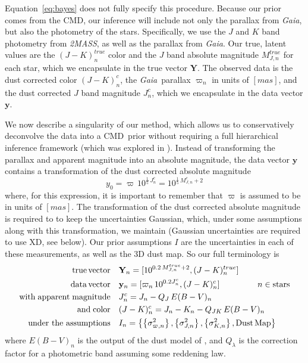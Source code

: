 \documentclass[modern]{aastex61}
\newcommand{\acronym}[1]{{\small{#1}}}
\newcommand{\project}[1]{\textsl{#1}}
\newcommand{\tmass}{\project{\acronym{2MASS}}}
\newcommand{\gaia}{\project{Gaia}}
\newcommand{\xd}{\acronym{XD}}
\newcommand{\cmd}{\acronym{CMD}}
\begin{document}
Equation~\ref{eq:bayes} does not fully specify this procedure.
Because our prior comes from the \cmd, our inference will include not only the parallax from \gaia, but also the photometry of the stars. Specifically, we use the $J$ and $K$ band photometry from \tmass, as well as the parallax from \gaia. Our true, latent values are the $(J-K)^{true}_n$ color and the $J$ band absolute magnitude $M^{true}_{J,n}$ for each star, which we encapsulate in the true vector $\mathbf{Y}$. The observed data is the dust corrected color $(J-K)^c_n$, the \gaia\ parallax $\varpi_n$ in units of $[mas]$, and the dust corrected $J$ band magnitude $J^c_n$, which we encapsulate in the data vector $\mathbf{y}$.

We now describe a singularity of our method, which allows us to conservatively deconvolve the data into a \cmd\ prior without requiring a full hierarchical inference framework (which was explored in \citealt{leistedtHogg2017}).
Instead of transforming the parallax and apparent magnitude into an absolute magnitude, the data vector $\mathbf{y}$ contains a transformation of the dust corrected absolute magnitude
\begin{equation}
y_0 = \varpi\,10^{\frac{1}{5}\,J^c_n} = 10^{\frac{1}{5}\,M^c_{J,n} + 2}
\label{eq:transform}
\end{equation}
where, for this expression, it is important to remember that $\varpi$ is assumed to be in units of $[mas]$.
The transformation of the dust corrected absolute magnitude is required to to keep the uncertainties Gaussian, which, under some assumptions along with this transformation, we maintain (Gaussian uncertainties are required to use \xd, see below).
Our prior assumptions $I$ are the uncertainties in each of these measurements, as well as the 3D dust map. So our full terminology is
\begin{equation}
\begin{aligned}
\mathrm{true \, vector} \quad &\mathbf{Y}_n = [10^{0.2\,M^{true}_{J,n} + 2}, (J-K)^{true}_n] \\
\mathrm{data \, vector} \quad &\mathbf{y}_n = [\varpi_n\,10^{0.2J^c_n}, (J- K)^c_n] \;\hspace*{15mm}  n \in \mathrm{stars} \\
\mathrm{with \; apparent \; magnitude} \quad &J^c_n = J_n - Q_J\,E(B-V)_n \\
\mathrm{and \; color} \quad &(J - K)^c_n = J_n - K_n - Q_{JK}\,E(B-V)_n \\
\mathrm{under\ the\ assumptions} \quad &I_n = \left\{\left\{\sigma^2_{\varpi, n}\right\}, \left\{\sigma^2_{J,n}\right\}, \left\{\sigma^2_{K,n}\right\}, \mathrm{Dust \, Map}\right\}
\end{aligned}
\label{eq:data}
\end{equation}
where $E(B-V)_n$ is the output of the dust model of \cite{green15}, and $Q_{\lambda}$ is the correction factor for a photometric band assuming some reddening law.
\end{document}
